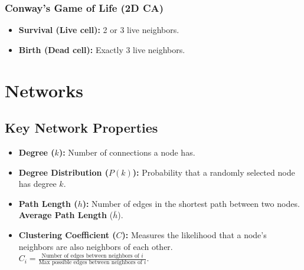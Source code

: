 \documentclass{report}
\begin{document}
\subsection*{Conway's Game of Life (2D CA)}
\begin{itemize}
    \item \textbf{Survival (Live cell):} 2 or 3 live neighbors.
    \item \textbf{Birth (Dead cell):} Exactly 3 live neighbors.
    \end{itemize}

\chapter*{Networks}

\section*{Key Network Properties}
\begin{itemize}
    \item \textbf{Degree ($k$):} Number of connections a node has.
    \item \textbf{Degree Distribution ($P(k)$):} Probability that a randomly selected node has degree $k$.
    \item \textbf{Path Length ($h$):} Number of edges in the shortest path between two nodes. \textbf{Average Path Length} ($\bar{h}$).
    \item \textbf{Clustering Coefficient ($C$):} Measures the likelihood that a node's neighbors are also neighbors of each other. $C_i = \frac{\text{Number of edges between neighbors of } i}{\text{Max possible edges between neighbors of } i}$.
\end{itemize}
\end{document}
